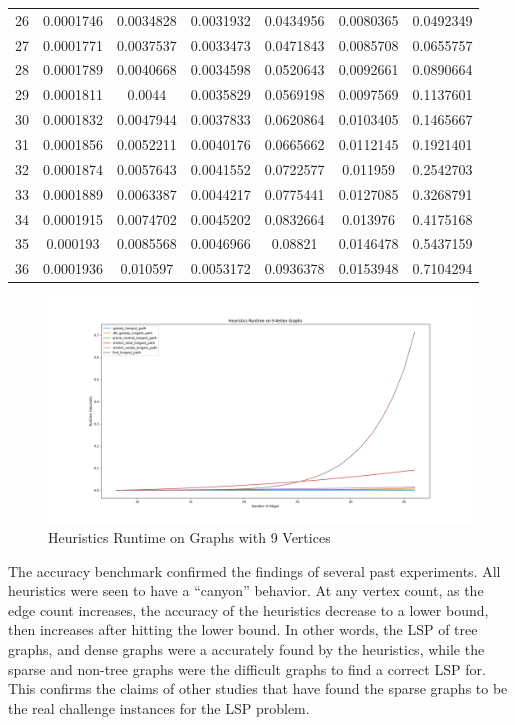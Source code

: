 \documentclass[twocolumn,showpacs,%
  nofootinbib,aps,superscriptaddress,%
  eqsecnum,prd,notitlepage,showkeys,11pt]{article}
\begin{document}
\begin{table}[htp]
\begin{tabular}{@{} *{7}{c} @{}}
 26 & 0.0001746 & 0.0034828 & 0.0031932 & 0.0434956 & 0.0080365 & 0.0492349 \\
 27 & 0.0001771 & 0.0037537 & 0.0033473 & 0.0471843 & 0.0085708 & 0.0655757 \\
 28 & 0.0001789 & 0.0040668 & 0.0034598 & 0.0520643 & 0.0092661 & 0.0890664 \\
 29 & 0.0001811 & 0.0044 & 0.0035829 & 0.0569198 & 0.0097569 & 0.1137601 \\
 30 & 0.0001832 & 0.0047944 & 0.0037833 & 0.0620864 & 0.0103405 & 0.1465667 \\
 31 & 0.0001856 & 0.0052211 & 0.0040176 & 0.0665662 & 0.0112145 & 0.1921401 \\
 32 & 0.0001874 & 0.0057643 & 0.0041552 & 0.0722577 & 0.011959 & 0.2542703 \\
 33 & 0.0001889 & 0.0063387 & 0.0044217 & 0.0775441 & 0.0127085 & 0.3268791 \\
 34 & 0.0001915 & 0.0074702 & 0.0045202 & 0.0832664 & 0.013976 & 0.4175168 \\
 35 & 0.000193 & 0.0085568 & 0.0046966 & 0.08821 & 0.0146478 & 0.5437159 \\
 36 & 0.0001936 & 0.010597 & 0.0053172 & 0.0936378 & 0.0153948 & 0.7104294
\end{tabular}
\end{table}

\begin{figure}[htp]
    \centering
    \includegraphics[width=\linewidth]{Runtime9VertexAll.png}
    \caption{Heuristics Runtime on Graphs with 9 Vertices}
    \label{fig:ExampleGraph}
\end{figure}

The accuracy benchmark confirmed the findings of several past experiments. All heuristics were seen to have a ``canyon'' behavior. At any vertex count, as the edge count increases, the accuracy of the heuristics decrease to a lower bound, then increases after hitting the lower bound. In other words, the LSP of tree graphs, and dense graphs were a accurately found by the heuristics, while the sparse and non-tree graphs were the difficult graphs to find a correct LSP for. This confirms the claims of other studies that have found the sparse graphs to be the real challenge instances for the LSP problem. 
\end{document}

